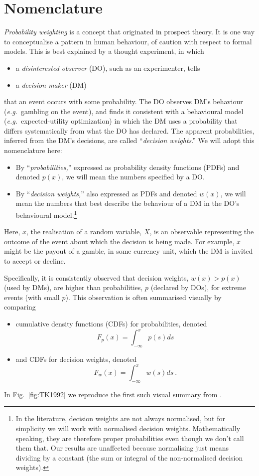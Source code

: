 \documentclass[a4paper, 12pt]{article}
\newcommand{\bi}{\begin{itemize}}
\newcommand{\ei}{\end{itemize}}
\newcommand{\fref}[1]{Fig.~\ref{fig:#1}}
\newcommand{\eg}{{\it e.g.}\ }
\newcommand{\be}{\begin{equation}}
\newcommand{\ee}{\end{equation}}
\begin{document}
\section{Nomenclature}
{\it Probability weighting} is a concept that originated in prospect theory. It is one way to conceptualise a pattern in human behaviour, of caution with respect to formal models.
This is best explained by a thought experiment, in which  
\bi
	\item a \textit{disinterested observer} (DO), such as an experimenter, tells
	\item a \textit{decision maker} (DM) 
\ei
that an event occurs with some probability. The DO observes DM's behaviour (\eg gambling on the event), and finds it consistent with a behavioural model (\eg expected-utility optimization) in which the DM uses a probability that differs systematically from what the DO has declared. The apparent probabilities, inferred from the DM's decisions, are called ``{\it decision weights}.'' We will adopt this nomenclature here: 
% 
\bi
	\item By ``\textit{probabilities,}'' expressed as probability density functions (PDFs) and denoted $p(x)$, we will mean the numbers specified by a DO.
	\item By ``\textit{decision weights,}'' also expressed as PDFs and denoted $w(x)$, we will mean the numbers that best describe the behaviour of a DM in the DO's behavioural model.\footnote{In the literature, decision weights are not always normalised, but for simplicity we will work with normalised decision weights. Mathematically speaking, they are therefore proper probabilities even though we don't call them that. Our results are unaffected because normalising just means dividing by a constant (the sum or integral of the non-normalised decision weights).}
\ei
Here, $x$, the realisation of a random variable, $X$, is an observable representing the outcome of the event about which the decision is being made. For example, $x$ might be the payout of a gamble, in some currency unit, which the DM is invited to accept or decline.

Specifically, it is consistently observed that decision weights, $w(x)>p(x)$ (used by DMs), are higher than probabilities,  $p$ (declared by DOs), for extreme events (with small $p$). 
This observation is often summarised visually by comparing 
\bi
\item cumulative density functions (CDFs) for probabilities, denoted 
\be
F_p(x)=\int_{-\infty}^x p(s) ds
\ee
\item and CDFs for decision weights, denoted
\be
F_w(x)=\int_{-\infty}^x w(s) ds ~.
\ee
\ei
In \fref{TK1992} we reproduce the first such visual summary from \citet[p.~310]{TverskyKahneman1992}.
\end{document}
